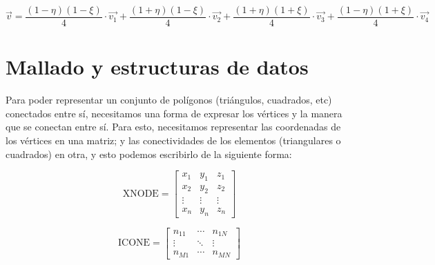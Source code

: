\begin{equation}
\label{eq:vdechieta}  
  \vec{v} = 
  \frac{ (1-\eta)(1-\xi) }{4} \cdot \vec{v_1} + 
  \frac{ (1+\eta)(1-\xi) }{4} \cdot \vec{v_2} + 
  \frac{ (1+\eta)(1+\xi) }{4} \cdot \vec{v_3} +  
  \frac{ (1-\eta)(1+\xi) }{4} \cdot \vec{v_4} 
\end{equation} 

 \section{Mallado y estructuras de datos}
 \label{sec:mallado}

Para poder representar un conjunto de polígonos (triángulos, cuadrados, etc) conectados entre sí, necesitamos una forma de expresar los vértices y la manera que se conectan entre sí. Para esto, necesitamos representar las coordenadas de los vértices en una matriz; y las conectividades de los elementos (triangulares o cuadrados) en otra, y esto podemos escribirlo de la siguiente forma:

\begin{equation}
  \label{eq:xnode}
  \text{XNODE}=
  \begin{bmatrix}
    x_1 & y_1 & z_1 \\
    x_2 & y_2 & z_2 \\
    \vdots & \vdots & \vdots \\
    x_n & y_n & z_n
  \end{bmatrix}
\end{equation}

\begin{equation}
  \label{eq:icone}
  \text{ICONE}=
  \begin{bmatrix}
    n_{11} & \cdots & n_{1N} \\
    \vdots & \ddots & \vdots \\
    n_{M1} & \cdots & n_{MN}
  \end{bmatrix}
\end{equation}

